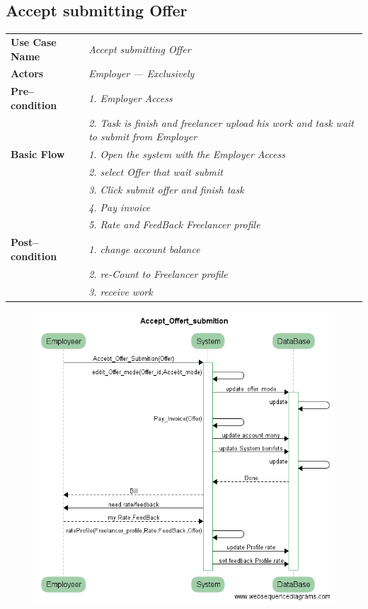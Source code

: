 \documentclass{article}
\begin{document}
\newpage
\subsection{Accept submitting Offer}
    \begin{tabular}{ l | l }
    \toprule
      \rowcolor{LightCyan}
      \textbf{Use Case Name}    & \textit{Accept submitting Offer}\\
      \textbf{Actors}           & \textit{Employer --- Exclusively}\\
      \rowcolor{LightCyan}
      \textbf{Pre--condition}   & \textit{1. Employer Access}\\
                                & \textit{2. Task is finish and freelancer upload his work and task wait to submit from Employer}\\
      \textbf{Basic Flow}       & \textit{1. Open the system with the Employer Access}\\
                                & \textit{2. select Offer that wait submit}\\
                                & \textit{3. Click submit offer and finish task}\\
                                & \textit{4. Pay invoice}\\
				& \textit{5. Rate and FeedBack Freelancer profile}\\
      \rowcolor{LightCyan}
      \textbf{Post--condition}  & \textit{1. change account balance}\\
                                & \textit{2. re-Count to Freelancer profile}\\
                                & \textit{3. receive work}\\
    \toprule
    \end{tabular}

\begin{figure}[ht!]
\centering
\includegraphics[width=128mm]{Accept_Offert_submition_usecase.png}
\end{figure}
\end{document}
